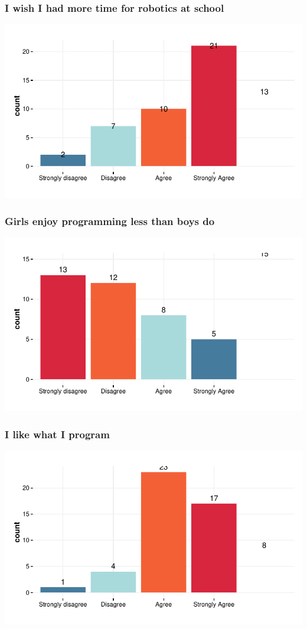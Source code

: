 \documentclass{article}
\begin{document}
\subsubsection{I wish I had more time for robotics at school }
\includegraphics{Raw_num/plots/-plot_plus_de_robotik}

\subsubsection{Girls enjoy programming less than boys do }
\includegraphics{Raw_num/plots/-plot_filles_moins_prog}

\subsubsection{I like what I program }
\includegraphics{Raw_num/plots/-plot_aime_prog}
\end{document}
